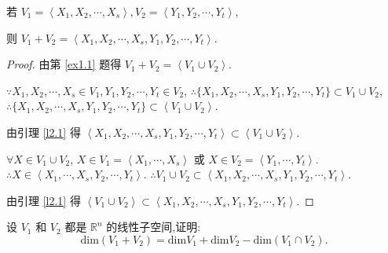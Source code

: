 \documentclass{ctexart}
\begin{document}
\begin{lemma}\label{l2.2}
    若 $V_1=\left<X_1,X_2,\cdots,X_s\right>,V_2=\left<Y_1,Y_2,\cdots,Y_t\right>$,
    
    则 $V_1+V_2=\left<X_1,X_2,\cdots,X_s,Y_1,Y_2,\cdots,Y_t\right>$.
\end{lemma}
\begin{proof}
    由第 \ref{ex1.1} 题得 $V_1+V_2=\left<V_1\cup V_2\right>$.

    $\because X_1,X_2,\cdots,X_s\in V_1,Y_1,Y_2,\cdots,Y_t\in V_2$, $\therefore\{X_1,X_2,\cdots,X_s,Y_1,Y_2,\cdots,Y_t\}\subset V_1\cup V_2$, $\therefore\{X_1,X_2,\cdots,X_s,Y_1,Y_2,\cdots,Y_t\}\subset\left<V_1\cup V_2\right>$.
    
    由引理 \ref{l2.1} 得 $\left<X_1,X_2,\cdots,X_s,Y_1,Y_2,\cdots,Y_t\right>\subset\left<V_1\cup V_2\right>$.

    $\forall X\in V_1\cup V_2$, $X\in V_1=\left<X_1,\cdots,X_s\right>$ 或 $X\in V_2=\left<Y_1,\cdots,Y_t\right>$. $\therefore X\in\left<X_1,\cdots,X_s,Y_2,\cdots,Y_t\right>$. $\therefore V_1\cup V_2\subset\left<X_1,X_2,\cdots,X_s,Y_1,Y_2,\cdots,Y_t\right>$.
    
    由引理 \ref{l2.1} 得 $\left<V_1\cup V_2\right>\subset\left<X_1,X_2,\cdots,X_s,Y_1,Y_2,\cdots,Y_t\right>$.
\end{proof}
\begin{exercise}[有改动]\label{ex1.7}
设 $V_1$ 和 $V_2$ 都是 $\mathbb{R}^n$ 的线性子空间,证明:
$$\mathrm{dim}(V_1+V_2)=\mathrm{dim}V_1+\mathrm{dim}V_2-\mathrm{dim}(V_1\cap V_2).$$
\end{exercise}
\end{document}
